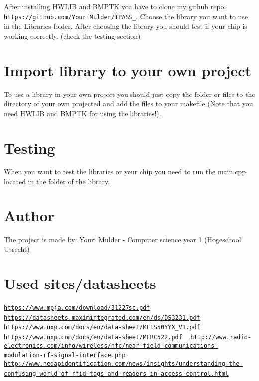 After installing H\+W\+L\+IB and B\+M\+P\+TK you have to clone my github repo\+: \href{https://github.com/YouriMulder/IPASS_2018}{\tt https\+://github.\+com/\+Youri\+Mulder/\+I\+P\+A\+S\+S\+\_}. Choose the library you want to use in the Libraries folder. After choosing the library you should test if your chip is working correctly. (check the testing section)\hypertarget{index_import_sec}{}\section{Import library to your own project}\label{index_import_sec}
To use a library in your own project you should just copy the folder or files to the directory of your own projected and add the files to your makefile (Note that you need H\+W\+L\+IB and B\+M\+P\+TK for using the libraries!).\hypertarget{index_test_sec}{}\section{Testing}\label{index_test_sec}
When you want to test the libraries or your chip you need to run the main.\+cpp located in the folder of the library.\hypertarget{index_author_sec}{}\section{Author}\label{index_author_sec}
The project is made by\+: Youri Mulder -\/ Computer science year 1 (Hogeschool Utrecht)\hypertarget{index_reeferences_sec}{}\section{Used sites/datasheets}\label{index_reeferences_sec}
\href{https://www.mpja.com/download/31227sc.pdf}{\tt https\+://www.\+mpja.\+com/download/31227sc.\+pdf} ~\newline
 \href{https://datasheets.maximintegrated.com/en/ds/DS3231.pdf}{\tt https\+://datasheets.\+maximintegrated.\+com/en/ds/\+D\+S3231.\+pdf} ~\newline
 \href{https://www.nxp.com/docs/en/data-sheet/MF1S50YYX_V1.pdf}{\tt https\+://www.\+nxp.\+com/docs/en/data-\/sheet/\+M\+F1\+S50\+Y\+Y\+X\+\_\+\+V1.\+pdf} ~\newline
 \href{https://www.nxp.com/docs/en/data-sheet/MFRC522.pdf}{\tt https\+://www.\+nxp.\+com/docs/en/data-\/sheet/\+M\+F\+R\+C522.\+pdf} ~\newline
 \href{http://www.radio-electronics.com/info/wireless/nfc/near-field-communications-modulation-rf-signal-interface.php}{\tt http\+://www.\+radio-\/electronics.\+com/info/wireless/nfc/near-\/field-\/communications-\/modulation-\/rf-\/signal-\/interface.\+php} ~\newline
 \href{http://www.nedapidentification.com/news/insights/understanding-the-confusing-world-of-rfid-tags-and-readers-in-access-control.html}{\tt http\+://www.\+nedapidentification.\+com/news/insights/understanding-\/the-\/confusing-\/world-\/of-\/rfid-\/tags-\/and-\/readers-\/in-\/access-\/control.\+html} ~\newline
 